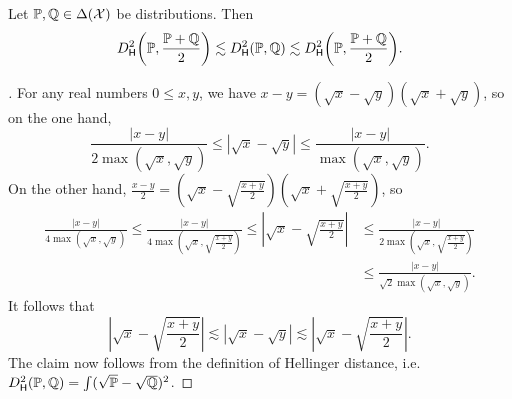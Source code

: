\begin{lemma}\label{lemma:avg-hels}
Let $\mathbb{P},\mathbb{Q} \in \Delta(\mathcal{X})$ be distributions. Then
\[\Dhels{\BP}{\frac{\BP+\BQ}{2}} \lesssim \Dhels{\BP}{\BQ} \lesssim \Dhels{\BP}{\frac{\BP+\BQ}{2}}.\]
\end{lemma}

\begin{proof}[]
For any real numbers $0 \leq x,y$, we have $x-y = (\sqrt{x} - \sqrt{y})(\sqrt{x} + \sqrt{y})$, so on the one hand,
\[\frac{|x-y|}{2\max(\sqrt{x},\sqrt{y})} \leq |\sqrt{x}-\sqrt{y}| \leq \frac{|x-y|}{\max(\sqrt{x},\sqrt{y})}.\]
On the other hand, $\frac{x-y}{2} = (\sqrt{x} - \sqrt{\frac{x+y}{2}})(\sqrt{x} + \sqrt{\frac{x+y}{2}})$, so
\begin{align}\frac{|x-y|}{4\max(\sqrt{x},\sqrt{y})} \leq \frac{|x-y|}{4\max(\sqrt{x},\sqrt{\frac{x+y}{2}})} \leq \left|\sqrt{x} - \sqrt{\frac{x+y}{2}}\right| &\leq \frac{|x-y|}{2\max(\sqrt{x},\sqrt{\frac{x+y}{2}})} \\&\leq \frac{|x-y|}{\sqrt{2} \max(\sqrt{x},\sqrt{y})}.\end{align}
It follows that
\[\left|\sqrt{x} - \sqrt{\frac{x+y}{2}}\right| \lesssim |\sqrt{x}-\sqrt{y}| \lesssim \left|\sqrt{x} - \sqrt{\frac{x+y}{2}}\right|.\]
The claim now follows from the definition of Hellinger distance, i.e. $\Dhels{\BP}{\BQ} = \int (\sqrt{\BP} - \sqrt{\BQ})^2$.
\end{proof}




